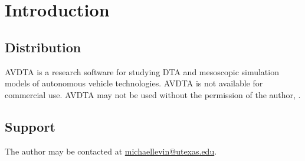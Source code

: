 \chapter{Introduction}





\section*{Distribution}
AVDTA is a research software for studying DTA and mesoscopic simulation models of autonomous vehicle technologies. AVDTA is not available for commercial use. AVDTA may not be used without the permission of the author, \theauthor.


\section*{Support}
The author may be contacted at \href{mailto:michaellevin@utexas.edu}{michaellevin@utexas.edu}.